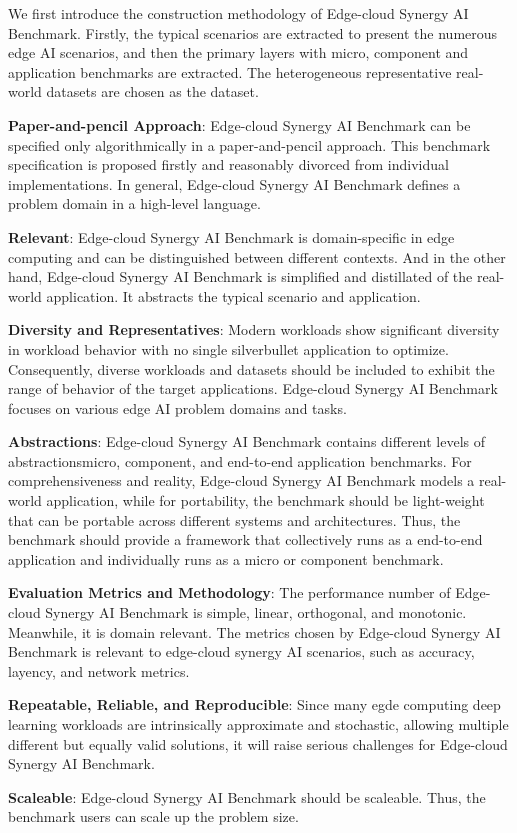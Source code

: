 We first introduce the construction methodology of Edge-cloud Synergy AI Benchmark. Firstly, the typical scenarios are
extracted to present the numerous edge AI scenarios, and then the primary layers with micro, component and application benchmarks are extracted. The heterogeneous representative real-world
datasets are chosen as the dataset.

\textbf{Paper-and-pencil Approach}: Edge-cloud Synergy AI Benchmark can be specified only algorithmically in a paper-and-pencil approach. This benchmark specification is proposed firstly and reasonably divorced from individual implementations. In general, Edge-cloud Synergy AI Benchmark defines a problem domain in a high-level language.

\textbf{Relevant}: Edge-cloud Synergy AI Benchmark is domain-specific in edge computing and can be distinguished between different contexts. And in the other hand, Edge-cloud Synergy AI Benchmark is simplified and distillated of the real-world application. It abstracts the typical scenario and application.

\textbf{Diversity and Representatives}: Modern workloads show significant diversity in workload behavior with no single silverbullet application to optimize. Consequently, diverse workloads and datasets should be included to exhibit the range of behavior of the target applications. Edge-cloud Synergy AI Benchmark focuses on various edge AI problem domains and tasks.

\textbf{Abstractions}: Edge-cloud Synergy AI Benchmark contains different levels of abstractionsmicro, component, and end-to-end application benchmarks. For comprehensiveness and reality, Edge-cloud Synergy AI Benchmark models a real-world application, while for portability, the benchmark should be light-weight that can be portable across different systems and architectures. Thus, the benchmark should provide a framework that collectively runs as a end-to-end application and individually runs as a micro or component benchmark.

\textbf{Evaluation Metrics and Methodology}: The performance number of Edge-cloud Synergy AI Benchmark is simple, linear, orthogonal, and monotonic. Meanwhile, it is domain relevant. The metrics chosen by Edge-cloud Synergy AI Benchmark is relevant to edge-cloud synergy AI scenarios, such as accuracy, layency, and network metrics.

\textbf{Repeatable, Reliable, and Reproducible}: Since many egde computing deep learning workloads are intrinsically approximate and stochastic, allowing multiple different but equally valid solutions, it will raise serious challenges for Edge-cloud Synergy AI Benchmark.

\textbf{Scaleable}: Edge-cloud Synergy AI Benchmark should be scaleable. Thus, the benchmark users can scale up the problem size. 